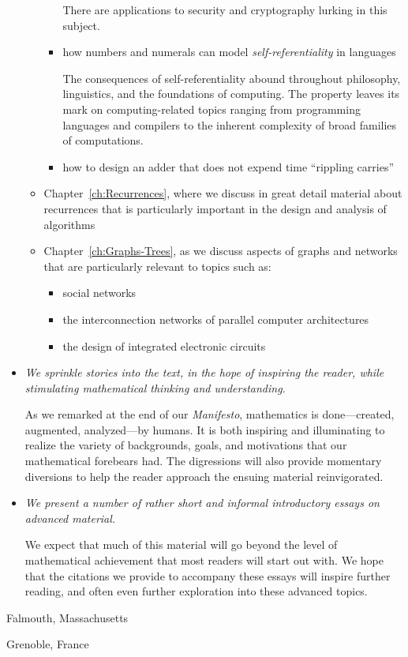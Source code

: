 \begin{itemize}
\begin{itemize}
\begin{itemize}
There are applications to security and cryptography lurking in this
subject.
     \item
how numbers and numerals can model {\em self-referentiality} in
languages

The consequences of self-referentiality abound throughout philosophy,
linguistics, and the foundations of computing.  The property leaves
its mark on computing-related topics ranging from programming
languages and compilers to the inherent complexity of broad families
of computations.
     \item
how to design an adder that does not expend time ``rippling carries''
     \end{itemize}
  \item
Chapter~\ref{ch:Recurrences}, where we discuss in great detail
material about recurrences that is particularly important in the
design and analysis of algorithms
  \item
Chapter~\ref{ch:Graphs-Trees}, as we discuss aspects of graphs and
networks that are particularly relevant to topics such as:
     \begin{itemize}
     \item
social networks
     \item
the interconnection networks of parallel computer architectures
     \item
the design of integrated electronic circuits
     \end{itemize}
  \end{itemize}

\item
{\em We sprinkle stories into the text, in the hope of inspiring the
  reader, while stimulating mathematical thinking and understanding.}

As we remarked at the end of our {\it Manifesto}, mathematics is
done---created, augmented, analyzed---by humans.  It is both inspiring
and illuminating to realize the variety of backgrounds, goals, and
motivations that our mathematical forebears had.  The digressions will
also provide momentary diversions to help the reader approach the
ensuing material reinvigorated.

\item
{\em We present a number of rather short and informal introductory
  essays on advanced material.}

We expect that much of this material will go beyond the level of
mathematical achievement that most readers will start out with.  We
hope that the citations we provide to accompany these essays will
inspire further reading, and often even further exploration into these
advanced topics.
\end{itemize}

\bigskip

\hfill Falmouth, Massachusetts

\hfill Grenoble, France



